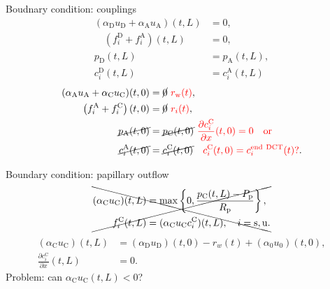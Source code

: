 \documentclass{beamer}
\begin{document}
\begin{frame}{Boudnary condition: couplings}
    \begin{align}
        (\alpha_\mathrm{D}u_\mathrm{D}+\alpha_\mathrm{A}u_\mathrm{A})(t,L) &= 0,\\
        \quad\left( f_i^\mathrm{D}+f_i^\mathrm{A} \right)(t,L) &= 0,\\
        p_\mathrm{D}(t,L)&= p_{\mathrm{A}}(t,L),\\ 
        c_i^\mathrm{D}(t,L) &=c_i^\mathrm{A}(t,L)
    \end{align}
    \begin{align}
        (\alpha_\mathrm{A}u_\mathrm{A}+\alpha_\mathrm{C}u_\mathrm{C})(t,0) &= \cancel{0}\ {\color{red}r_\mathrm{w}(t)},\\
        \quad\left( f_i^\mathrm{A}+f_i^\mathrm{C} \right)(t,0) &= \cancel{0}\ {\color{red}r_i(t)},\\
        \cancel{p_\mathrm{A}(t,0)}&=  \cancel{p_{\mathrm{C}}(t,0)} {
            \color{red}
            \ \frac{\partial c_i^\mathrm{C}}{\partial x}(t,0) = 0\quad \mathrm{or}
        }\\ 
        \cancel{c_i^\mathrm{A}(t,0)} &= \cancel{c_i^\mathrm{C}(t,0)}\quad {\color{red}c_i^\mathrm{C}(t,0) = c_i^{\mathrm{end\ DCT}}(t)?}.\nonumber
    \end{align}
\end{frame}

\begin{frame}{Boundary condition: papillary outflow}
    \begin{equation*}
        \xcancel{\begin{aligned}
            (\alpha_\mathrm{C} u_\mathrm{C} )(t,L) &= \max\left\{ 0,\frac{p_\mathrm{C} (t,L) - P_{\mathrm{p}} }{R_{\mathrm{p}}}\right\},\\
            f_i^\mathrm{C}(t,L) &= (\alpha_\mathrm{C}  u_\mathrm{C}  c_i^\mathrm{C})(t,L),\quad i=\mathrm{s},\mathrm{u}.
        \end{aligned}}
    \end{equation*}
    {\color{red}
        \begin{align}
            (\alpha_\mathrm{C}u_\mathrm{C})(t,L) &= (\alpha_\mathrm{D}u_\mathrm{D})(t,0) - r_w(t)+(\alpha_0u_0)(t,0),\\
            \frac{\partial c_i^\mathrm{C}}{\partial x}(t,L) &= 0.\label{eq:no_diff_pap}
        \end{align}
        Problem: can $\alpha_\mathrm{C}u_\mathrm{C}(t,L)<0$?
    }
\end{frame}
\end{document}
